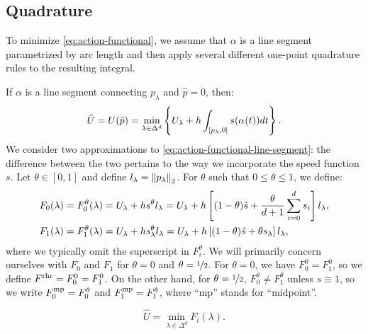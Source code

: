 \documentclass[sisc-eikonal.tex]{subfiles}
\begin{document}
\subsection{Quadrature}\label{ssec:quadrature}

To minimize \cref{eq:action-functional}, we assume that $\alpha$ is a
line segment parametrized by arc length and then apply several
different one-point quadrature rules to the resulting integral.

If $\alpha$ is a line segment connecting $p_\lambda$ and
$\hat{p} = 0$, then:
\begin{equation}
  \label{eq:action-functional-line-segment}
  \hat{U} = U(\hat{p}) = \min_{\lambda \in \Delta^d} \set{U_\lambda + h \int_{[p_\lambda, 0]} s(\alpha(t))dt}.
\end{equation}
We consider two approximations to \cref{eq:action-functional-line-segment}: the
difference between the two pertains to the way we incorporate the
speed function $s$. Let $\theta \in [0, 1]$ and define
$l_\lambda = \left\|p_\lambda\right\|_2$. For $\theta$ such that
$0 \leq \theta \leq 1$, we define:
\begin{align}
  F_0(\lambda) = F_0^\theta(\lambda) &= U_\lambda + h s^{\theta} l_\lambda = U_\lambda + h \squareb{(1-\theta)\hat{s} + \frac{\theta}{d + 1} \sum_{i=0}^d s_i} l_\lambda, \label{eq:f0-definition} \\
  F_1(\lambda) = F_1^\theta(\lambda) &= U_\lambda + h s^{\theta}_\lambda l_\lambda = U_\lambda + h \squareb{(1-\theta)\hat{s} + \theta s_\lambda} l_\lambda,
\end{align}
where we typically omit the superscript in $F_i^\theta$. We will
primarily concern ourselves with $F_0$ and $F_1$ for $\theta = 0$ and
$\theta = \nicefrac{1}{2}$. For $\theta = 0$, we have $F_0^0 = F_1^0$,
so we define $F^{\operatorname{rhr}} = F_0^0 = F_1^0$. On the other hand, for
$\theta = \nicefrac{1}{2}$, $F_0^{\theta} \neq F_1^{\theta}$ unless
$s \equiv 1$, so we write $F_0^{\operatorname{mp}} = F_0^{\theta}$ and
$F_1^{\operatorname{mp}} = F_1^{\theta}$, where ``mp'' stands for ``midpoint''.

\begin{equation}
  \label{eq:constrained-minimization}
  \hat{U} = \min_{\lambda \in \Delta^d} F_i(\lambda).
\end{equation}
\end{document}
